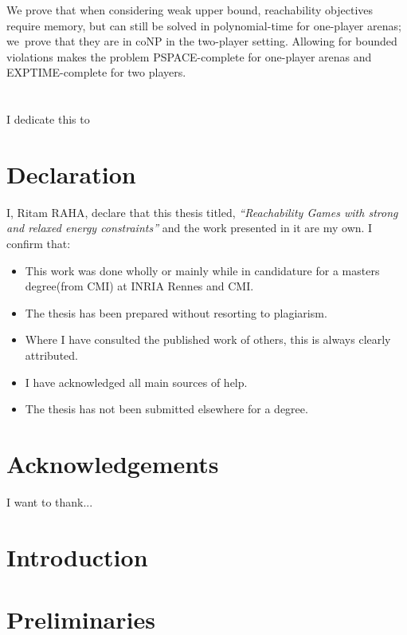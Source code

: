 \documentclass[a4paper, 12pt, twoside]{book}
\theoremstyle{definition}
\begin{document}
%
We prove that when considering weak upper bound, reachability
objectives require memory, but can still be solved in polynomial-time
for one-player arenas; we~prove that they are in coNP in the two-player
setting. Allowing for bounded violations makes the
problem PSPACE-complete for one-player arenas and EXPTIME-complete
for two players.

\chapter*{%
}
I dedicate this to 
 
\chapter*{Declaration}
I, Ritam RAHA, declare that this thesis titled, \textit{“Reachability Games with strong and relaxed energy constraints”} and the work presented in it are my own. I confirm that:
\vskip 1cm
\begin{itemize}
    \item This work was done wholly or mainly while in candidature for a masters degree(from CMI) at INRIA Rennes and CMI.
    \item The thesis has been prepared without resorting to plagiarism.
    \item Where I have consulted the published work of others, this is always clearly attributed.
    \item I have acknowledged all main sources of help.
    \item The thesis has not been submitted elsewhere for a degree.
\end{itemize}
\vskip 2cm

\chapter*{Acknowledgements}
I want to thank...

\tableofcontents

\chapter{Introduction}

 
\chapter{Preliminaries}

 
\end{document}
